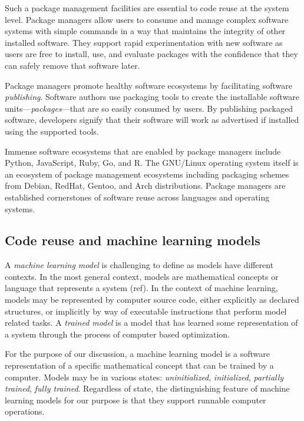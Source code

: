 \documentclass{article}
\begin{document}
Such a package management facilities are essential to code reuse at
the system level. Package managers allow users to consume and manage
complex software systems with simple commands in a way that maintains
the integrity of other installed software. They support rapid
experimentation with new software as users are free to install, use,
and evaluate packages with the confidence that they can safely remove
that software later.

Package managers promote healthy software ecosystems by facilitating
software \emph{publishing}. Software authors use packaging tools to
create the installable software units---\emph{packages}---that are so
easily consumed by users. By publishing packaged software, developers
signify that their software will work as advertised if installed using
the supported tools.

Immense software ecosystems that are enabled by package managers
include Python, JavaScript, Ruby, Go, and R. The GNU/Linux operating
system itself is an ecosystem of package management ecosystems
including packaging schemes from Debian, RedHat, Gentoo, and Arch
distributions. Package managers are established cornerstones of
software reuse across languages and operating systems.

\subsection{Code reuse and machine learning models}

A \emph{machine learning model} is challenging to define as models
have different contexts. In the most general context, models are
mathematical concepts or language that represents a system (ref). In
the context of machine learning, models may be represented by computer
source code, either explicitly as declared structures, or implicitly
by way of executable instructions that perform model related tasks. A
\emph{trained model} is a model that has learned some representation
of a system through the process of computer based optimization.

For the purpose of our discussion, a machine learning model is a
software representation of a specific mathematical concept that can be
trained by a computer. Models may be in various states:
\emph{uninitialized}, \emph{initialized}, \emph{partially trained},
\emph{fully trained}. Regardless of state, the distinguishing feature
of machine learning models for our purpose is that they support
runnable computer operations.
\end{document}
